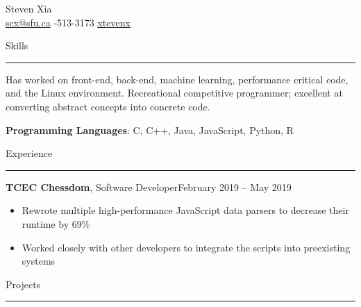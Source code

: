 \documentclass{article}
\newcommand{\entrytitle}[3]{\vspace{0.5em}\textbf{#1}, #2\hfill #3}
\renewcommand{\section}[1]{\vspace{0.5em}\Large{#1}\vspace{0.3em}\hrule\normalsize{}}
\newenvironment{entrybody}{\begin{itemize}[itemsep=0.3em]}{\end{itemize}}
\begin{document}
\pagestyle{empty}


\begin{center}
    \huge{Steven Xia} \\\vspace{0.5em}
    \normalsize{\faEnvelope\: \href{mailto:scx@sfu.ca}{scx@sfu.ca}} \qquad
    \normalsize{\faPhoneSquare*{}-513-3173} \qquad
    \normalsize{\faGithub\: \href{https://github.com/xtevenx}{xtevenx}}
\end{center} %


\section{Skills} \vspace{0.5em}

Has worked on front-end, back-end, machine learning, performance critical code, and the Linux environment.
Recreational competitive programmer; excellent at converting abstract concepts into concrete code.
\vspace{-0.2em}

\textbf{Programming Languages}: C, C++, Java, JavaScript, Python, R


\section{Experience}


\entrytitle{TCEC Chessdom}{Software Developer}{February 2019 – May 2019}
\begin{entrybody}
\item Rewrote multiple high-performance JavaScript data parsers to decrease their runtime by 69\%
\item Worked closely with other developers to integrate the scripts into preexisting systems
\end{entrybody}


\section{Projects}
\end{document}

